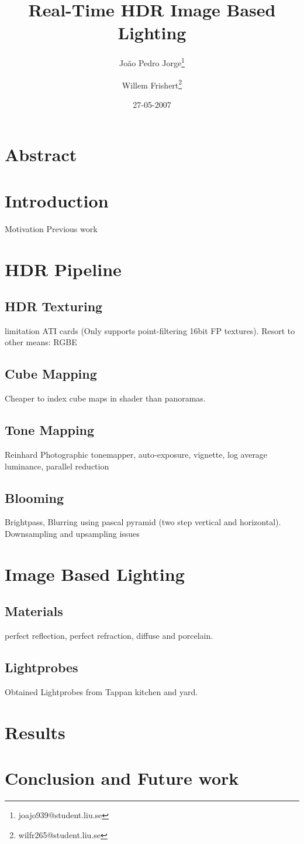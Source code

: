 \documentclass[twocolumn,8pt]{article}
\title{Real-Time HDR Image Based Lighting}
\author{Jo\~{a}o Pedro Jorge\thanks{joajo939@student.liu.se} \and Willem Frishert\thanks{wilfr265@student.liu.se}}
\date{27-05-2007}
\begin{document}
\small
\maketitle

\section{Abstract}

\section{Introduction}
Motivation
Previous work

\section{HDR Pipeline}

\subsection{HDR Texturing}
limitation ATI cards (Only supports point-filtering 16bit FP textures). Resort to other means: RGBE

\subsection{Cube Mapping}
Cheaper to index cube maps in shader than panoramas.

\subsection{Tone Mapping}
Reinhard Photographic tonemapper, auto-exposure, vignette, log average luminance, parallel reduction

\subsection{Blooming}
Brightpass, Blurring using pascal pyramid (two step vertical and horizontal). Downsampling and upsampling issues

\section{Image Based Lighting}

\subsection{Materials}
perfect reflection, perfect refraction, diffuse and porcelain.

\subsection{Lightprobes}
Obtained Lightprobes from Tappan kitchen and yard.

\section{Results}

\section{Conclusion and Future work}


{}
	
\end{document}

